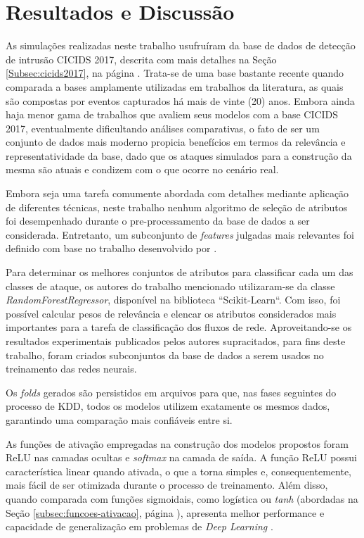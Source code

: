 \chapter{Resultados e Discussão}
\label{resultados_discussao}

As simulações realizadas neste trabalho usufruíram da base de dados de detecção de intrusão CICIDS 2017, descrita com mais detalhes na Seção \ref{Subsec:cicids2017}, na página \pageref{Subsec:cicids2017}. Trata-se de uma base bastante recente quando comparada a bases amplamente utilizadas em trabalhos da literatura, as quais são compostas por eventos capturados há mais de vinte (20) anos. Embora ainda haja menor gama de trabalhos que avaliem seus modelos com a base CICIDS 2017, eventualmente dificultando análises comparativas, o fato de ser um conjunto de dados mais moderno propicia benefícios em termos da relevância e representatividade da base, dado que os ataques simulados para a construção da mesma são atuais e condizem com o que ocorre no cenário real.

Embora seja uma tarefa comumente abordada com detalhes mediante aplicação de diferentes técnicas, neste trabalho nenhum algoritmo de seleção de atributos foi desempenhado durante o pre-processamento da base de dados a ser considerada. Entretanto, um subconjunto de \textit{features} julgadas mais relevantes foi definido com base no trabalho desenvolvido por .

Para determinar os melhores conjuntos de atributos para classificar cada um das classes de ataque, os autores do trabalho mencionado utilizaram-se da classe \textit{RandomForestRegressor}, disponível na biblioteca ``Scikit-Learn``. Com isso, foi possível calcular pesos de relevância e elencar os atributos considerados mais importantes para a tarefa de classificação dos fluxos de rede. Aproveitando-se os resultados experimentais publicados pelos autores supracitados, para fins deste trabalho, foram criados subconjuntos da base de dados a serem usados no treinamento das redes neurais.



Os \textit{folds} gerados são persistidos em arquivos para que, nas fases seguintes do processo de KDD, todos os modelos utilizem exatamente os mesmos dados, garantindo uma comparação mais confiáveis entre si.

As funções de ativação empregadas na construção dos modelos propostos foram ReLU nas camadas ocultas e \textit{softmax} na camada de saída. A função ReLU possui característica linear quando ativada, o que a torna simples e, consequentemente, mais fácil de ser otimizada durante o processo de treinamento. Além disso, quando comparada com funções sigmoidais, como logística ou \textit{tanh} (abordadas na Seção \ref{subsec:funcoes-ativacao}, página \pageref{subsec:funcoes-ativacao}), apresenta melhor performance e capacidade de generalização em problemas de \textit{Deep Learning} \cite{nwankpa2018}.

